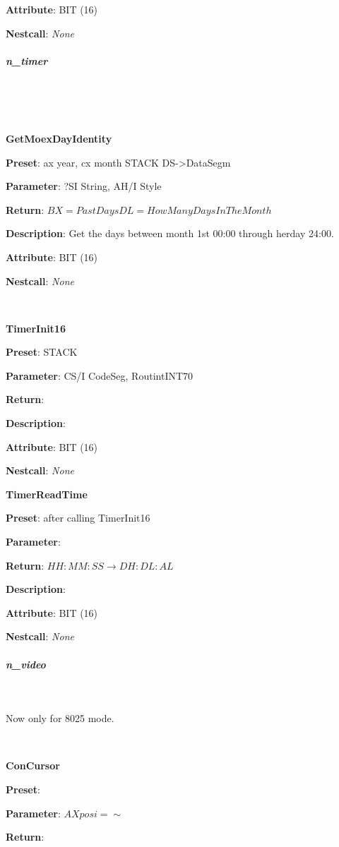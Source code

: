 \textbf{Attribute}: BIT (16)

\textbf{Nestcall}: \textit{None}



\subparagraph{n\_timer} \



 \

\textbf{GetMoexDayIdentity}

\textbf{Preset}: ax year, cx month STACK DS-\textgreater{}DataSegm

\textbf{Parameter}: ?SI String, AH/I Style

\textbf{Return}: $BX=PastDays DL=HowManyDaysInTheMonth$

\textbf{Description}: Get the days between month 1st 00:00 through herday 24:00.

\textbf{Attribute}: BIT (16)

\textbf{Nestcall}: \textit{None}



 \

\textbf{TimerInit16}

\textbf{Preset}: STACK

\textbf{Parameter}: CS/I CodeSeg, RoutintINT70

\textbf{Return}:

\textbf{Description}:

\textbf{Attribute}: BIT (16)

\textbf{Nestcall}: \textit{None}

\textbf{TimerReadTime}

\textbf{Preset}: after calling TimerInit16

\textbf{Parameter}:

\textbf{Return}: $HH:MM:SS \rightarrow DH:DL:AL$

\textbf{Description}:

\textbf{Attribute}: BIT (16)

\textbf{Nestcall}: \textit{None}



\subparagraph{n\_video} \

Now only for 8025 mode.



 \

\textbf{ConCursor}

\textbf{Preset}:

\textbf{Parameter}: $AX posi=\sim$

\textbf{Return}:

